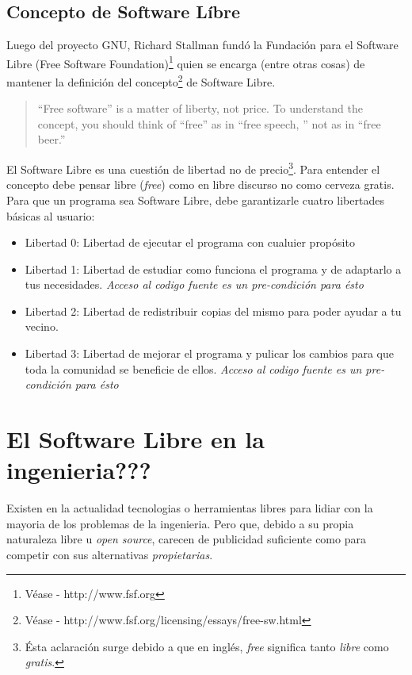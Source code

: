 
\subsection{Concepto de Software L\'ibre}
Luego del proyecto GNU, Richard Stallman fund\'o la Fundaci\'on para el 
Software Libre (Free Software Foundation)\footnote{V\'ease - http://www.fsf.org} 
quien se encarga (entre otras cosas) de mantener la definici\'on del concepto\footnote{V\'ease - http://www.fsf.org/licensing/essays/free-sw.html} de Software Libre.

\begin{quote}
``Free software'' is a matter of liberty, not price. 
To understand the concept, you should think of ``free'' as in ``free speech,
'' not as in ``free beer.''
\end{quote}

El Software Libre es una cuesti\'on de libertad no de precio\footnote{\'Esta
aclaraci\'on surge debido a que en ingl\'es, \emph{free} significa tanto
\emph{libre} como \emph{gratis}.}. Para entender el concepto debe pensar libre
(\emph{free}) como en libre discurso no como cerveza gratis.\\


Para que un programa sea Software Libre, debe garantizarle cuatro libertades
b\'asicas al usuario:

\begin{itemize}
\item Libertad 0: Libertad de ejecutar el programa con cualuier prop\'osito
\item Libertad 1: Libertad de estudiar como funciona el programa y de adaptarlo
a tus necesidades. \emph{Acceso al codigo fuente es un pre-condici\'on para
\'esto}
\item Libertad 2: Libertad de redistribuir copias del mismo para poder ayudar a
tu vecino.
\item Libertad 3: Libertad de mejorar el programa y pulicar los cambios para
que toda la comunidad se beneficie de ellos. \emph{Acceso al codigo fuente es 
un pre-condici\'on para \'esto}
\end{itemize}



\section{El Software Libre en la ingenieria???} %
Existen en la actualidad tecnologias o herramientas libres para lidiar con la
mayoria de los problemas de la ingenieria. Pero que, debido a su propia
naturaleza libre u \emph{open source}, carecen de publicidad suficiente como
para competir con sus alternativas \emph{propietarias}. \\


